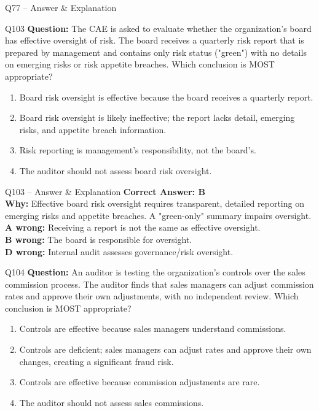 \documentclass[aspectratio=169,10pt]{beamer}
\begin{document}
\begin{frame}[t]{Q77 -- Answer \& Explanation}
	\begin{frame}[t]{Q103}
		\small
		\textbf{Question:} The CAE is asked to evaluate whether the organization's board has effective oversight of risk. The board receives a quarterly risk report that is prepared by management and contains only risk status ("green") with no details on emerging risks or risk appetite breaches. Which conclusion is MOST appropriate?
		\begin{enumerate}[label=\Alph*.,itemsep=1pt,topsep=2pt]
			\item Board risk oversight is effective because the board receives a quarterly report.
			\item Board risk oversight is likely ineffective; the report lacks detail, emerging risks, and appetite breach information.
			\item Risk reporting is management's responsibility, not the board's.
			\item The auditor should not assess board risk oversight.
		\end{enumerate}
	\end{frame}
	
	\begin{frame}[t]{Q103 -- Answer \& Explanation}
		\small
		\textbf{Correct Answer: B} \\[4pt]
		\textbf{Why:} Effective board risk oversight requires transparent, detailed reporting on emerging risks and appetite breaches. A "green-only" summary impairs oversight. \\[4pt]
		\textbf{A wrong:} Receiving a report is not the same as effective oversight. \\[2pt]
		\textbf{B wrong:} The board is responsible for oversight. \\[2pt]
		\textbf{D wrong:} Internal audit assesses governance/risk oversight.
	\end{frame}
	
	\begin{frame}[t]{Q104}
		\small
		\textbf{Question:} An auditor is testing the organization's controls over the sales commission process. The auditor finds that sales managers can adjust commission rates and approve their own adjustments, with no independent review. Which conclusion is MOST appropriate?
		\begin{enumerate}[label=\Alph*.,itemsep=1pt,topsep=2pt]
			\item Controls are effective because sales managers understand commissions.
			\item Controls are deficient; sales managers can adjust rates and approve their own changes, creating a significant fraud risk.
			\item Controls are effective because commission adjustments are rare.
			\item The auditor should not assess sales commissions.
		\end{enumerate}
	\end{frame}
	

\end{frame}
\end{document}
